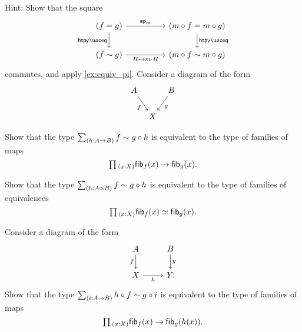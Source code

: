 \begin{exercises}
  Hint: Show that the square
  \begin{equation*}
    \begin{tikzcd}[column sep=huge]
      (f=g) \arrow[r,"\apfunc{m}"] \arrow[d,swap,"\htpyeq"] & (m\circ f=m\circ g) \arrow[d,"\htpyeq"] \\
      (f\htpy g) \arrow[r,swap,"H\mapsto m\cdot H"] & (m\circ f\htpy m\circ g)
    \end{tikzcd}
  \end{equation*}
  commutes, and apply \cref{ex:equiv_pi}.
\exercise \label{ex:triangle_fib}Consider a diagram of the form
\begin{equation*}
\begin{tikzcd}[column sep=tiny]
A \arrow[dr,swap,"f"] & & B \arrow[dl,"g"] \\
& X
\end{tikzcd}
\end{equation*}
\begin{subexenum}
\item Show that the type $\sm{h:A\to B} f\htpy g\circ h$ is equivalent to the type of families of maps
\begin{equation*}
\prd{x:X}\fib{f}{x}\to\fib{g}{x}.
\end{equation*}
\item Show that the type $\sm{h:\eqv{A}{B}} f\htpy g\circ h$ is equivalent to the type of families of equivalences
\begin{equation*}
\prd{x:X}\fib{f}{x}\eqvsym\fib{g}{x}.
\end{equation*}
\end{subexenum}
\exercise \label{ex:sq_fib}Consider a diagram of the form
\begin{equation*}
\begin{tikzcd}
A \arrow[d,swap,"f"] & B \arrow[d,"g"] \\
X \arrow[r,swap,"h"] & Y.
\end{tikzcd}
\end{equation*}
Show that the type $\sm{i:A\to B}h\circ f\htpy g\circ i$ is equivalent to the type of families of maps
\begin{equation*}
\prd{x:X}\fib{f}{x}\to\fib{g}{h(x)}.
\end{equation*}

\end{exercises}
